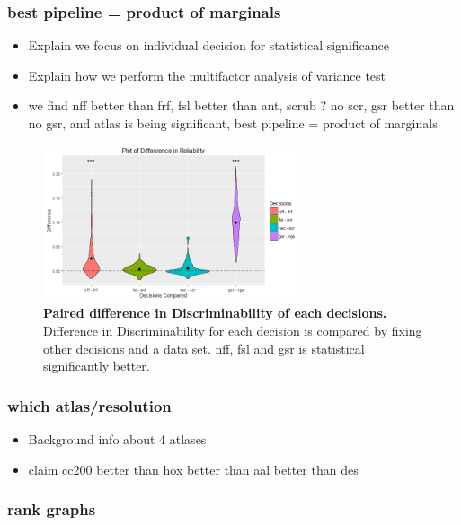 \documentclass{article}
\begin{document}
\subsubsection{best pipeline = product of marginals}
\begin{itemize}
	\item Explain we focus on individual decision for statistical significance
	\item Explain how we perform the multifactor analysis of variance test
	\item we find nff better than frf, fsl better than ant, scrub ? no scr, gsr better than no gsr, and atlas is being significant, best pipeline = product of marginals
\end{itemize}

\begin{figure}[t!]
\includegraphics[width=3.0in]{../Figs/Differ_violin_mean.png}
\caption{{ \bf Paired difference in Discriminability of each decisions.} Difference in Discriminability for each decision is compared by fixing other decisions and a data set. nff, fsl and gsr is statistical significantly better. }
\label{fig:7}
\end{figure}

\subsubsection{which atlas/resolution}
\begin{itemize}
	\item Background info about 4 atlases
	\item claim cc200 better than hox  better than aal better than des
\end{itemize}

\subsubsection{rank graphs}
\end{document}
